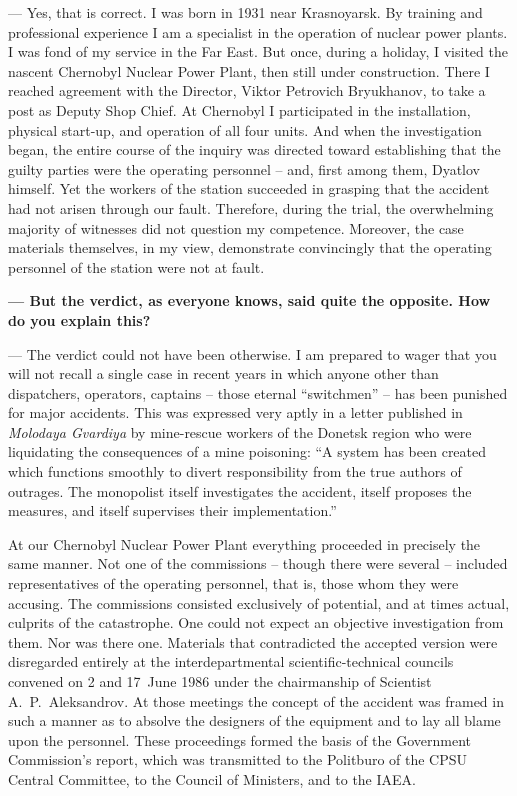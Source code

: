 \documentclass[openright]{bookest}
\begin{document}
\noindent
--- Yes, that is correct. I was born in 1931 near Krasnoyarsk. By training and professional experience I am a specialist in the operation of nuclear power plants. I was fond of my service in the Far East. But once, during a holiday, I visited the nascent Chernobyl Nuclear Power Plant, then still under construction. There I reached agreement with the Director, Viktor
Petrovich Bryukhanov, to take a post as Deputy Shop Chief. At Chernobyl I participated in the installation, physical start-up, and operation of all four units. And when the investigation began, the entire course of the inquiry was directed toward establishing that the guilty parties were the operating personnel -- and, first among them, Dyatlov himself. Yet the workers of the station succeeded in grasping that the accident had not arisen through our fault. Therefore, during the trial, the overwhelming majority of witnesses did not question my competence. Moreover, the case materials themselves, in my view, demonstrate convincingly that the operating personnel of the station were not at fault.

\medskip

\textbf{--- But the verdict, as everyone knows, said quite the opposite. How do you explain this?}

\noindent
--- The verdict could not have been otherwise. I am prepared to wager that you will not recall a single case in recent years in which anyone other than dispatchers, operators, captains -- those eternal ``switchmen'' -- has been punished for major accidents. This was expressed very aptly in a letter published in \textit{Molodaya Gvardiya} by mine-rescue
workers of the Donetsk region who were liquidating the consequences of a mine poisoning: ``A system has been created which functions smoothly to divert responsibility from the true authors of outrages. The monopolist itself investigates the accident, itself proposes the measures, and itself supervises their implementation.''

At our Chernobyl Nuclear Power Plant everything proceeded in precisely the same manner. Not one of the commissions -- though there were several -- included representatives of the operating personnel, that is, those whom they were accusing. The commissions consisted exclusively of potential, and at times actual, culprits of the catastrophe. One could not expect an objective investigation from them. Nor was there one. Materials that contradicted the accepted version were disregarded entirely at the interdepartmental scientific-technical councils convened on 2 and 17~June 1986 under the chairmanship of Scientist A.~P.~Aleksandrov. At those meetings the concept of the accident was framed in such a manner as to absolve the designers of the equipment and to lay all blame upon the personnel. These proceedings formed the basis of the Government Commission's report, which was transmitted to the Politburo of the CPSU Central Committee, to the Council of Ministers, and to the IAEA.
\end{document}
